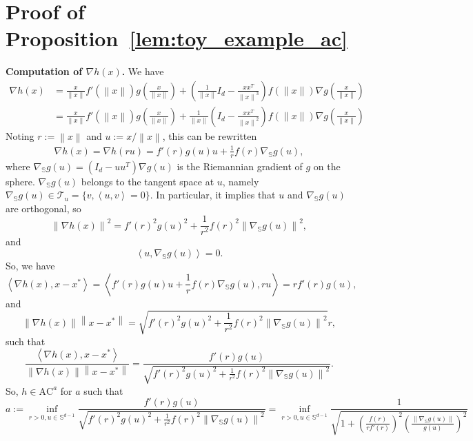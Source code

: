 \documentclass{article}
\def\sphere{\mathbb{S}}
\newcommand{\bpar}[1]{\left(#1\right)}
\newcommand{\norm}[1]{\left\lVert#1\right\rVert}
\newcommand{\dotprod}[1]{\left< #1\right>}
\newcommand{\ac}{\text{AC}^{a}}
\theoremstyle{plain}
\theoremstyle{definition}
\theoremstyle{remark}
\begin{document}
\section{Proof of Proposition~\ref{lem:toy_example_ac}}
\textbf{Computation of $\nabla h(x)$.} We have
\begin{equation}
    \begin{aligned}
        \nabla h(x) &= \frac{x}{\norm{x}}f'(\norm{x})g\left(\frac{x}{\lVert x \rVert} \right) + \bpar{\frac{1}{\norm{x}}I_d - \frac{x x^T}{\norm{x}^3}}f(\lVert x \rVert)\nabla g\left(\frac{x}{\lVert x \rVert} \right)\\
        &=\frac{x}{\norm{x}}f'(\norm{x})g\left(\frac{x}{\lVert x \rVert} \right) + \frac{1}{\norm{x}}\bpar{I_d -\frac{x x^T}{\norm{x}^2}}f(\lVert x \rVert)\nabla g\left(\frac{x}{\lVert x \rVert} \right)
    \end{aligned}
\end{equation}
Noting $r := \norm{x}$ and $u :=x/\norm{x}$, this can be rewritten
\begin{equation}
    \begin{aligned}
        \nabla h(x) = \nabla  h(ru) = f'(r)g(u)u + \frac{1}{r}f(r) \nabla_{\sphere} g(u),
    \end{aligned}
\end{equation}
where $\nabla_{\sphere} g(u) = (I_d-uu^T)\nabla g(u)$ is the Riemannian gradient of $g$ on the sphere. $\nabla_{\sphere} g(u)$ belongs to the tangent space at $u$, namely $\nabla_{\sphere} g(u) \in  \mathcal{T}_u = \{ v, \dotprod{u,v} = 0 \}$. In particular, it implies that $u$ and $\nabla_{\sphere} g(u)$ are orthogonal, so
\[\norm{\nabla h(x)}^2 =f'(r)^ 2g(u)^2 + \frac{1}{r^2}f(r)^2 \norm{\nabla_{\sphere} g(u)}^2, \]
and 
\[\dotprod{u,\nabla_{\sphere} g(u)} = 0.\]
So, we have
\[\dotprod{\nabla h(x),x-x^\ast} = \dotprod{f'(r)g(u)u + \frac{1}{r}f(r) \nabla_{\sphere} g(u),ru} = rf'(r)g(u),\]
 and 
 \[\norm{\nabla h(x)}\norm{x-x^\ast} = \sqrt{f'(r)^ 2g(u)^2 + \frac{1}{r^2}f(r)^2 \norm{\nabla_{\sphere} g(u)}^2}r, \]
 such that
 \[\frac{\dotprod{\nabla h(x),x-x^\ast} }{\norm{\nabla h(x)}\norm{x-x^\ast}} = \frac{f'(r)g(u)}{\sqrt{f'(r)^ 2g(u)^2 + \frac{1}{r^2}f(r)^2 \norm{\nabla_{\sphere} g(u)}^2}}.\]
 So, $h \in \ac$ for $a$ such that
 \[a := \inf_{r>0,u \in \mathbb{S}^{d-1}} \frac{f'(r)g(u)}{\sqrt{f'(r)^ 2g(u)^2 + \frac{1}{r^2}f(r)^2 \norm{\nabla_{\sphere} g(u)}^2}} = \inf_{r>0,u \in \mathbb{S}^{d-1}} \frac{1}{\sqrt{1+ \bpar{\frac{f(r)}{rf'(r)}}^2 \bpar{\frac{\norm{\nabla_{\sphere} g(u)}}{g(u)}}^2}}  \]
\end{document}
